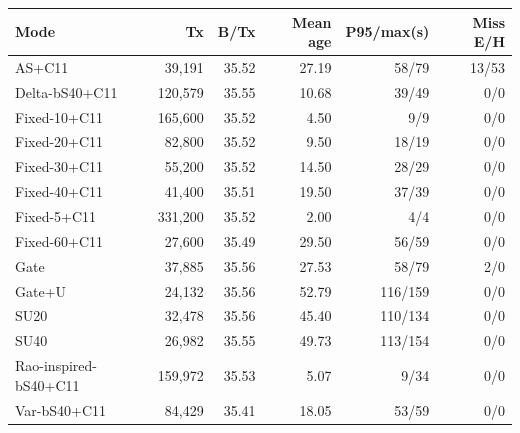 \setlength{\tabcolsep}{3pt}\begin{tabular}{lrrrrr}\toprule
Mode & Tx & B/Tx & Mean age & P95/max(s) & Miss E/H \\\midrule
AS+C11 & 39,191 & 35.52 & 27.19 & 58/79 & 13/53 \\
Delta-bS40+C11 & 120,579 & 35.55 & 10.68 & 39/49 & 0/0 \\
Fixed-10+C11 & 165,600 & 35.52 & 4.50 & 9/9 & 0/0 \\
Fixed-20+C11 & 82,800 & 35.52 & 9.50 & 18/19 & 0/0 \\
Fixed-30+C11 & 55,200 & 35.52 & 14.50 & 28/29 & 0/0 \\
Fixed-40+C11 & 41,400 & 35.51 & 19.50 & 37/39 & 0/0 \\
Fixed-5+C11 & 331,200 & 35.52 & 2.00 & 4/4 & 0/0 \\
Fixed-60+C11 & 27,600 & 35.49 & 29.50 & 56/59 & 0/0 \\
Gate & 37,885 & 35.56 & 27.53 & 58/79 & 2/0 \\
Gate+U & 24,132 & 35.56 & 52.79 & 116/159 & 0/0 \\
SU20 & 32,478 & 35.56 & 45.40 & 110/134 & 0/0 \\
SU40 & 26,982 & 35.55 & 49.73 & 113/154 & 0/0 \\
Rao-inspired-bS40+C11 & 159,972 & 35.53 & 5.07 & 9/34 & 0/0 \\
Var-bS40+C11 & 84,429 & 35.41 & 18.05 & 53/59 & 0/0 \\
\bottomrule\end{tabular}
